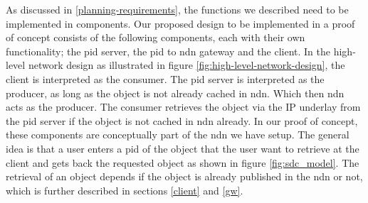 
As discussed in \ref{planning-requirements}, the functions we described need to be implemented in components. Our proposed design to be implemented in a proof of concept consists of the following components, each with their own functionality; the \gls{pid} server, the \gls{pid} to \gls{ndn} gateway and the client. In the high-level network design as illustrated in figure \ref{fig:high-level-network-design}, the client is interpreted as the consumer. The \gls{pid} server is interpreted as the producer, as long as the object is not already cached in \gls{ndn}. Which then \gls{ndn} acts as the producer. The consumer retrieves the object via the IP underlay from the \gls{pid} server if the object is not cached in \gls{ndn} already. In our proof of concept, these components are conceptually part of the \gls{ndn} we have setup. The general idea is that a user enters a \gls{pid} of the object that the user want to retrieve at the client and gets back the requested object as shown in figure \ref{fig:sdc_model}. The retrieval of an object depends if the object is already published in the \gls{ndn} or not, which is further described in sections \ref{client} and \ref{gw}.



 
